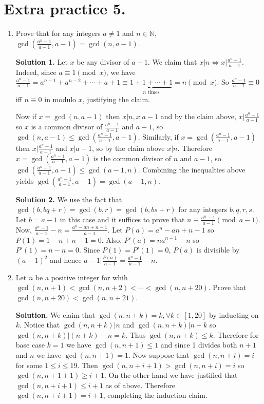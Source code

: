 \documentclass[11pt]{article}
\begin{document}
\section{Extra practice 5.}
\begin{enumerate}
\item Prove that for any integers $a\neq 1$ and $n\in\mathbb{N}$, $\gcd \left (\frac{a^n-1}{a-1}, a-1\right)=\gcd (n, a-1)$.

\textbf{Solution 1.} Let $x$ be any divisor of $a-1$. We claim that $x|n\Leftrightarrow x|\frac{a^n-1}{a-1}$. Indeed, since $a\equiv 1\pmod {x}$, we have $\frac{a^n-1}{a-1}=a^{n-1}+a^{n-2}+\cdots +a+1\equiv \underbrace{1+1+\cdots +1}_{\text {$n$ times}}=n\pmod {x}$. So $\frac{a^n-1}{a-1}\equiv 0$ iff $n\equiv 0$ in modulo $x$, justifying the claim.

Now if $x=\gcd (n, a-1)$ then $x|n, x|a-1$ and by the claim above, $x|\frac{a^n-1}{a-1}$ so $x$ is a common divisor of $\frac{a^n-1}{a-1}$ and $a-1$, so $\gcd (n, a-1)\le\gcd (\frac{a^n-1}{a-1}, a-1).$ Similarly, if $x=\gcd (\frac{a^n-1}{a-1}, a-1)$ then $x|\frac{a^n-1}{a-1}$ and $x|a-1$, so by the claim above $x|n$. Therefore $x=\gcd (\frac{a^n-1}{a-1}, a-1)$ is the common divisor of $n$ and $a-1$, so $\gcd (\frac{a^n-1}{a-1}, a-1)\le \gcd(a-1, n)$. Combining the inequalties above yields $\gcd (\frac{a^n-1}{a-1}, a-1)= \gcd(a-1, n)$.

\textbf{Solution 2.} We use the fact that $\gcd (b, bq+r)=\gcd (b, r)=\gcd(b,bs+r)$ for any integers $b,q,r,s$. Let $b=a-1$ in this case and it suffices to prove that $n\equiv \frac{a^n-1}{a-1}\pmod{a-1}.$ Now, $\frac{a^n-1}{a-1}-n=\frac{a^n-an+n-1}{a-1}$. Let $P(a)=a^n-an+n-1$ so $P(1)=1-n+n-1=0$. Also, $P'(a)=na^{n-1}-n$ so $P'(1)=n-n=0$. Since $P(1)=P'(1)=0$, $P(a)$ is divisible by $(a-1)^2$ and hence $a-1|\frac{P(a)}{a-1}=\frac{a^n-1}{a-1}-n$.

\item Let $n$ be a positive integer for whih $\gcd(n, n+1)<\gcd (n, n+2)<\cdots <\gcd (n, n+20)$. Prove that $\gcd (n, n+20)<\gcd (n, n+21)$.

\textbf{Solution.} We claim that $\gcd (n,n+k)=k, \forall k\in [1,20]$ by inducting on $k$. Notice that $\gcd (n,n+k)|n$ and $\gcd (n,n+k)|n+k$ so $\gcd (n,n+k)|(n+k)-n=k$. Thus $\gcd (n,n+k)\le k.$ Therefore for base case $k=1$ we have $\gcd (n,n+1)\le 1$ and since 1 divides both $n+1$ and $n$ we have $\gcd (n, n+1)=1$. Now suppose that $\gcd (n, n+i)=i$ for some $1\le i\le 19$. Then $\gcd (n,n+i+1)>\gcd(n,n+i)=i$ so $\gcd (n,n+1+1)\ge i+1$. On the other hand we have justified that $\gcd (n,n+i+1)\le i+1$ as of above. Therefore $\gcd (n, n+i+1)=i+1$, completing the induction claim.


\end{enumerate}
\end{document}
